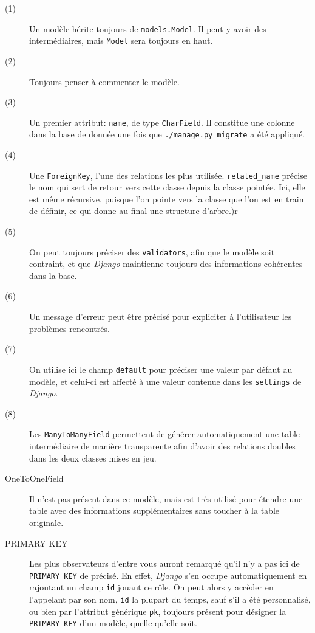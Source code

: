 \documentclass[a4paper]{report}
\begin{document}
\begin{description}
    \item[(1)] Un modèle hérite toujours de \verb#models.Model#. Il peut y avoir des intermédiaires, mais \verb#Model#
        sera toujours en haut.
    \item[(2)] Toujours penser à commenter le modèle.
    \item[(3)] Un premier attribut: \verb#name#, de type \verb#CharField#. Il constitue une colonne dans la base de
        donnée une fois que \verb#./manage.py migrate# a été appliqué.
    \item[(4)] Une \verb#ForeignKey#, l'une des relations les plus utilisée. \verb#related_name# précise le nom qui sert
        de retour vers cette classe depuis la classe pointée. Ici, elle est même récursive, puisque l'on pointe vers la
        classe que l'on est en train de définir, ce qui donne au final une structure d'arbre.)r
    \item[(5)] On peut toujours préciser des \verb#validators#, afin que le modèle soit contraint, et que \emph{Django}
        maintienne toujours des informations cohérentes dans la base.
    \item[(6)] Un message d'erreur peut être précisé pour expliciter à l'utilisateur les problèmes rencontrés.
    \item[(7)] On utilise ici le champ \verb#default# pour préciser une valeur par défaut au modèle, et celui-ci est
        affecté à une valeur contenue dans les \verb#settings# de \emph{Django}.
    \item[(8)] Les \verb#ManyToManyField# permettent de générer automatiquement une table intermédiaire de manière
        transparente afin d'avoir des relations doubles dans les deux classes mises en jeu.
    \item[OneToOneField] Il n'est pas présent dans ce modèle, mais est très utilisé pour étendre une table avec des
        informations supplémentaires sans toucher à la table originale.
    \item[PRIMARY KEY] Les plus observateurs d'entre vous auront remarqué qu'il n'y a pas ici de \verb#PRIMARY KEY# de précisé. En
        effet, \emph{Django} s'en occupe automatiquement en rajoutant un champ \verb#id# jouant ce rôle. On peut alors y
        accèder en l'appelant par son nom, \verb#id# la plupart du temps, sauf s'il a été personnalisé, ou bien par
        l'attribut générique \verb#pk#, toujours présent pour désigner la \verb#PRIMARY KEY# d'un modèle, quelle qu'elle
        soit.
\end{description}
\end{document}
